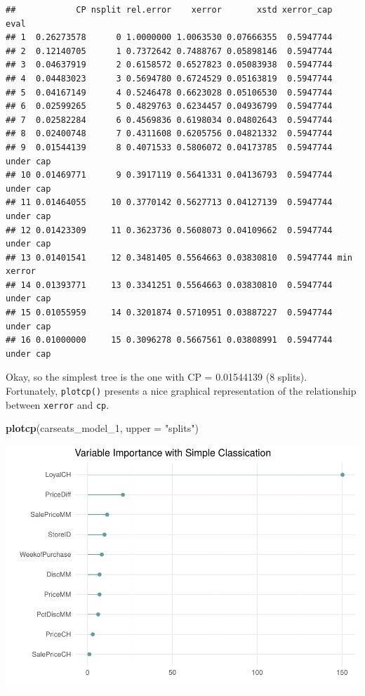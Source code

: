 \documentclass[
]{book}
\newenvironment{Shaded}{\begin{snugshade}}{\end{snugshade}}
\newcommand{\DataTypeTok}[1]{\textcolor[rgb]{0.13,0.29,0.53}{#1}}
\newcommand{\DecValTok}[1]{\textcolor[rgb]{0.00,0.00,0.81}{#1}}
\newcommand{\KeywordTok}[1]{\textcolor[rgb]{0.13,0.29,0.53}{\textbf{#1}}}
\newcommand{\NormalTok}[1]{#1}
\newcommand{\StringTok}[1]{\textcolor[rgb]{0.31,0.60,0.02}{#1}}
\begin{document}
\begin{verbatim}
##            CP nsplit rel.error    xerror       xstd xerror_cap       eval
## 1  0.26273578      0 1.0000000 1.0063530 0.07666355  0.5947744           
## 2  0.12140705      1 0.7372642 0.7488767 0.05898146  0.5947744           
## 3  0.04637919      2 0.6158572 0.6527823 0.05083938  0.5947744           
## 4  0.04483023      3 0.5694780 0.6724529 0.05163819  0.5947744           
## 5  0.04167149      4 0.5246478 0.6623028 0.05106530  0.5947744           
## 6  0.02599265      5 0.4829763 0.6234457 0.04936799  0.5947744           
## 7  0.02582284      6 0.4569836 0.6198034 0.04802643  0.5947744           
## 8  0.02400748      7 0.4311608 0.6205756 0.04821332  0.5947744           
## 9  0.01544139      8 0.4071533 0.5806072 0.04173785  0.5947744  under cap
## 10 0.01469771      9 0.3917119 0.5641331 0.04136793  0.5947744  under cap
## 11 0.01464055     10 0.3770142 0.5627713 0.04127139  0.5947744  under cap
## 12 0.01423309     11 0.3623736 0.5608073 0.04109662  0.5947744  under cap
## 13 0.01401541     12 0.3481405 0.5564663 0.03830810  0.5947744 min xerror
## 14 0.01393771     13 0.3341251 0.5564663 0.03830810  0.5947744  under cap
## 15 0.01055959     14 0.3201874 0.5710951 0.03887227  0.5947744  under cap
## 16 0.01000000     15 0.3096278 0.5667561 0.03808991  0.5947744  under cap
\end{verbatim}

Okay, so the simplest tree is the one with CP = 0.01544139 (8 splits). Fortunately, \texttt{plotcp()} presents a nice graphical representation of the relationship between \texttt{xerror} and \texttt{cp}.

\begin{Shaded}
\begin{Highlighting}[]
\KeywordTok{plotcp}\NormalTok{(carseats_model_}\DecValTok{1}\NormalTok{, }\DataTypeTok{upper =} \StringTok{"splits"}\NormalTok{)}
\end{Highlighting}
\end{Shaded}

\includegraphics{data-sci_files/figure-latex/unnamed-chunk-69-1.pdf}
\end{document}
